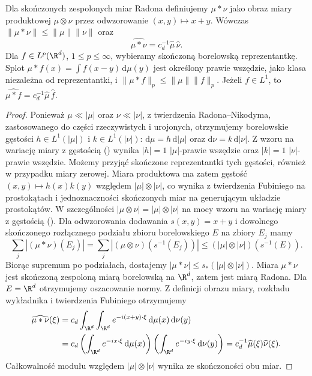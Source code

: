 \begin{stwierdzenie}
\label{prop:dt-fourier-measure-conv}
Dla skończonych zespolonych miar Radona definiujemy
$\mu*\nu$ jako obraz miary produktowej $\mu\otimes\nu$
przez odwzorowanie $(x,y)\mapsto x+y$. Wówczas
$\|\mu*\nu\|\le\|\mu\|\|\nu\|$ oraz
\[
 \widehat{\mu*\nu}=c_d^{-1}\widehat\mu\,\widehat\nu.
\]
Dla $f\in L^p(\R^d)$, $1\le p\le\infty$, wybieramy
skończoną borelowską reprezentantkę. Splot
$\mu*f(x)=\int f(x-y)\,\mathrm d\mu(y)$ jest określony
prawie wszędzie, jako klasa niezależna od reprezentantki,
i $\|\mu*f\|_p\le\|\mu\|\|f\|_p$.
Jeżeli $f\in L^1$, to
$\widehat{\mu*f}=c_d^{-1}\widehat\mu\,\widehat f$.
\end{stwierdzenie}
\begin{proof}
Ponieważ $\mu\ll|\mu|$ oraz $\nu\ll|\nu|$,
z twierdzenia Radona--Nikodyma, zastosowanego
do części rzeczywistych i urojonych, otrzymujemy
borelowskie gęstości $h\in L^1(|\mu|)$ i $k\in L^1(|\nu|)$:
$\mathrm d\mu=h\,\mathrm d|\mu|$ oraz
$\mathrm d\nu=k\,\mathrm d|\nu|$.
Z wzoru na wariację miary z gęstością
()
wynika $|h|=1$ $|\mu|$-prawie wszędzie oraz
$|k|=1$ $|\nu|$-prawie wszędzie. Możemy przyjąć
skończone reprezentantki tych gęstości, również
w przypadku miary zerowej. Miara produktowa ma zatem gęstość
$(x,y)\mapsto h(x)k(y)$ względem $|\mu|\otimes|\nu|$,
co wynika z twierdzenia Fubiniego na prostokątach
i jednoznaczności skończonych miar na generującym
układzie prostokątów. W szczególności
$|\mu\otimes\nu|=|\mu|\otimes|\nu|$ na mocy wzoru
na wariację miary z gęstością
().
Dla odwzorowania dodawania $s(x,y)=x+y$ i dowolnego
skończonego rozłącznego podziału zbioru borelowskiego
$E$ na zbiory $E_j$ mamy
\[
 \sum_j|(\mu*\nu)(E_j)|
 =\sum_j|(\mu\otimes\nu)(s^{-1}(E_j))|
 \le(|\mu|\otimes|\nu|)(s^{-1}(E)).
\]
Biorąc supremum po podziałach, dostajemy
$|\mu*\nu|\le s_*(|\mu|\otimes|\nu|)$.
Miara $\mu*\nu$ jest skończoną zespoloną miarą
borelowską na $\R^d$, zatem jest miarą Radona.
Dla $E=\R^d$ otrzymujemy oszacowanie normy.
Z definicji obrazu miary, rozkładu wykładnika
i twierdzenia Fubiniego otrzymujemy
\[
\begin{aligned}
 \widehat{\mu*\nu}(\xi)
 &=c_d\int_{\R^d}\int_{\R^d}e^{-i(x+y)\cdot\xi}
 \,\mathrm d\mu(x)\,\mathrm d\nu(y)\\
 &=c_d\left(\int_{\R^d}e^{-ix\cdot\xi}\,\mathrm d\mu(x)\right)
       \left(\int_{\R^d}e^{-iy\cdot\xi}\,\mathrm d\nu(y)\right)
 =c_d^{-1}\widehat\mu(\xi)\widehat\nu(\xi).
\end{aligned}
\]
Całkowalność modułu względem $|\mu|\otimes|\nu|$
wynika ze skończoności obu miar.


\end{proof}
